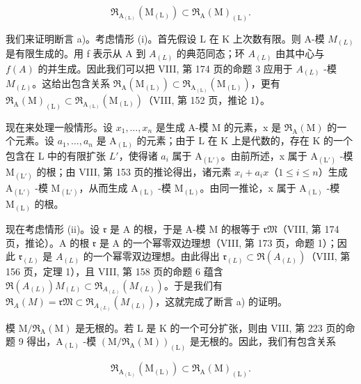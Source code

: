 \[
\mathfrak {R} _ {\mathrm{A} _ {(\mathrm{L})}} (\mathrm{M} _ {(\mathrm{L})}) \subset \mathfrak {R} _ {\mathrm{A}} (\mathrm{M}) _ {(\mathrm{L})}.
\]

我们来证明断言 a)。考虑情形 (i)。首先假设 L 在 K 上次数有限。则 A-模 \(M_{(L)}\) 是有限生成的。用 f 表示从 A 到 \(A_{(L)}\) 的典范同态；环 \(A_{(L)}\) 由其中心与 \(f(A)\) 的并生成。因此我们可以把 VIII, 第 174 页的命题 3 应用于 \(A_{(L)}\) -模 \(M_{(L)}\)。这给出包含关系 \(\mathfrak{R}_{\mathrm{A}}(\mathrm{M}_{(\mathrm{L})}) \subset \mathfrak{R}_{\mathrm{A}_{(\mathrm{L})}}(\mathrm{M}_{(\mathrm{L})})\)，更有 \(\mathfrak{R}_{\mathrm{A}}(\mathrm{M})_{(\mathrm{L})} \subset \mathfrak{R}_{\mathrm{A}_{(\mathrm{L})}}(\mathrm{M}_{(\mathrm{L})})\)（VIII, 第 152 页，推论 1）。

现在来处理一般情形。设 \(x_{1},\ldots,x_{n}\) 是生成 A-模 M 的元素，x 是 \(\mathfrak{R}_{\mathrm{A}}(\mathrm{M})\) 的一个元素。设 \(a_{1},\ldots,a_{n}\) 是 \(\mathrm{A}_{(\mathrm{L})}\) 的元素；由于 L 在 K 上是代数的，存在 K 的一个包含在 L 中的有限扩张 \(L'\)，使得诸 \(a_{i}\) 属于 \(\mathrm{A}_{(\mathrm{L}')}\)。由前所述，x 属于 \(\mathrm{A}_{(\mathrm{L}')}\) -模 \(\mathrm{M}_{(\mathrm{L}')}\) 的根；由 VIII, 第 153 页的推论得出，诸元素 \(x_{i}+a_{i}x\)（\(1\leqslant i\leqslant n\)）生成 \(\mathrm{A}_{(\mathrm{L}')}\) -模 \(\mathrm{M}_{(\mathrm{L}')}\)，从而生成 \(\mathrm{A}_{(\mathrm{L})}\) -模 \(\mathrm{M}_{(\mathrm{L})}\)。由同一推论，x 属于 \(\mathrm{A}_{(\mathrm{L})}\) -模 \(\mathrm{M}_{(\mathrm{L})}\) 的根。

现在考虑情形 (ii)。设 \(\mathfrak{r}\) 是 A 的根，于是 A-模 M 的根等于 \(\mathfrak{rM}\)（VIII, 第 174 页，推论）。A 的根 \(\mathfrak{r}\) 是 A 的一个幂零双边理想（VIII, 第 173 页，命题 1）；因此 \(\mathfrak{r}_{(L)}\) 是 \(A_{(L)}\) 的一个幂零双边理想。由此得出 \(\mathfrak{r}_{(L)} \subset \Re(A_{(L)})\)（VIII, 第 156 页，定理 1），且 VIII, 第 158 页的命题 6 蕴含 \(\Re(A_{(L)})M_{(L)} \subset \Re_{A_{(L)}}(M_{(L)})\)。于是我们有 \(\Re_A(M) = \mathfrak{rM} \subset \Re_{A_{(L)}}(M_{(L)})\)，这就完成了断言 a) 的证明。

模 \(\mathrm{M}/\mathfrak{R}_{\mathrm{A}}(\mathrm{M})\) 是无根的。若 L 是 K 的一个可分扩张，则由 VIII, 第 223 页的命题 9 得出，\(\mathrm{A}_{(\mathrm{L})}\) -模 \((\mathrm{M}/\mathfrak{R}_{\mathrm{A}}(\mathrm{M}))_{(\mathrm{L})}\) 是无根的。因此，我们有包含关系

\[
\mathfrak {R} _ {\mathrm{A} _ {(\mathrm{L})}} (\mathrm{M} _ {(\mathrm{L})}) \subset \mathfrak {R} _ {\mathrm{A}} (\mathrm{M}) _ {(\mathrm{L})}.
\]

